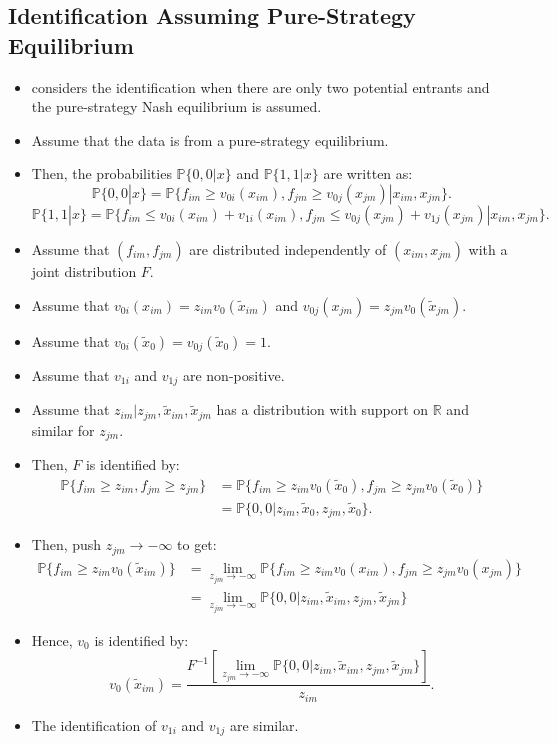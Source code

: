 \documentclass[
]{book}
\begin{document}
\hypertarget{identification-assuming-pure-strategy-equilibrium}{%
\subsection{Identification Assuming Pure-Strategy Equilibrium}\label{identification-assuming-pure-strategy-equilibrium}}

\begin{itemize}
\item
  \citet{tamerIncompleteSimultaneousDiscrete2003} considers the identification when there are only two potential entrants and the pure-strategy Nash equilibrium is assumed.
\item
  Assume that the data is from a pure-strategy equilibrium.
\item
  Then, the probabilities \(\mathbb{P}\{0, 0|x\}\) and \(\mathbb{P}\{1, 1|x\}\) are written as:
  \[
  \mathbb{P}\{0, 0|x\} = \mathbb{P}\{f_{im} \ge v_{0i}(x_{im}), f_{jm} \ge v_{0j}(x_{jm})|x_{im}, x_{jm}\}.
  \]
  \[
  \mathbb{P}\{1, 1|x\} = \mathbb{P}\{f_{im} \le v_{0i}(x_{im}) + v_{1i}(x_{im}), f_{jm} \le v_{0j}(x_{jm}) + v_{1j}(x_{jm})|x_{im}, x_{jm}\}.
  \]
\item
  Assume that \((f_{im}, f_{jm})\) are distributed independently of \((x_{im}, x_{jm})\) with a joint distribution \(F\).
\item
  Assume that \(v_{0i}(x_{im}) = z_{im} v_0(\tilde{x}_{im})\) and \(v_{0j}(x_{jm}) = z_{jm} v_0(\tilde{x}_{jm})\).
\item
  Assume that \(v_{0i}(\tilde{x}_0) = v_{0j}(\tilde{x}_0) = 1\).
\item
  Assume that \(v_{1i}\) and \(v_{1j}\) are non-positive.
\item
  Assume that \(z_{im}| z_{jm}, \tilde{x}_{im}, \tilde{x}_{jm}\) has a distribution with support on \(\mathbb{R}\) and similar for \(z_{jm}\).
\item
  Then, \(F\) is identified by:
  \[
  \begin{split}
  \mathbb{P}\{f_{im} \ge z_{im}, f_{jm} \ge z_{jm}\} &= \mathbb{P}\{ f_{im} \ge z_{im} v_0(\tilde{x}_{0}), f_{jm} \ge z_{jm} v_0(\tilde{x}_{0})\}\\
  &= \mathbb{P}\{0, 0|z_{im}, \tilde{x}_0, z_{jm}, \tilde{x}_0\}.
  \end{split}
  \]
\item
  Then, push \(z_{jm} \to - \infty\) to get:
  \[
  \begin{split}
  \mathbb{P}\{f_{im} \ge z_{im} v_0(\tilde{x}_{im})\} &= \lim_{z_{jm} \to - \infty} \mathbb{P}\{f_{im} \ge z_{im} v_0(x_{im}), f_{jm} \ge z_{jm} v_0(x_{jm})\}\\
  &= \lim_{z_{jm} \to - \infty} \mathbb{P}\{0, 0|z_{im}, \tilde{x}_{im}, z_{jm}, \tilde{x}_{jm}\}
  \end{split}
  \]
\item
  Hence, \(v_{0}\) is identified by:
  \[
  v_0(\tilde{x}_{im}) = \frac{F^{-1}[\lim_{z_{jm} \to - \infty} \mathbb{P}\{0, 0|z_{im}, \tilde{x}_{im}, z_{jm}, \tilde{x}_{jm}\}]}{z_{im}}.
  \]
\item
  The identification of \(v_{1i}\) and \(v_{1j}\) are similar.
\end{itemize}
\end{document}

